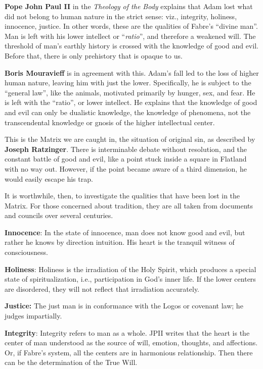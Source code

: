 \textbf{Pope John Paul II} in the \emph{Theology of the Body} explains that Adam lost what did not belong to human nature in the strict sense: viz., integrity, holiness, innocence, justice. In other words, these are the qualities of Fabre's ``divine man''. Man is left with his lower intellect or ``\emph{ratio}'', and therefore a weakened will. The threshold of man's earthly history is crossed with the knowledge of good and evil. Before that, there is only prehistory that is opaque to us.

\textbf{Boris Mouravieff} is in agreement with this. Adam's fall led to the loss of higher human nature, leaving him with just the lower. Specifically, he is subject to the ``general law'', like the animals, motivated primarily by hunger, sex, and fear. He is left with the ``ratio'', or lower intellect. He explains that the knowledge of good and evil can only be dualistic knowledge, the knowledge of phenomena, not the transcendental knowledge or gnosis of the higher intellectual center.

This is the Matrix we are caught in, the situation of original sin, as described by \textbf{Joseph Ratzinger}. There is interminable debate without resolution, and the constant battle of good and evil, like a point stuck inside a square in Flatland with no way out. However, if the point became aware of a third dimension, he would easily escape his trap.

It is worthwhile, then, to investigate the qualities that have been lost in the Matrix. For those concerned about tradition, they are all taken from documents and councils over several centuries.

\textbf{Innocence}: In the state of innocence, man does not know good and evil, but rather he knows by direction intuition. His heart is the tranquil witness of consciousness.

\textbf{Holiness}: Holiness is the irradiation of the Holy Spirit, which produces a special state of spiritualization, i.e., participation in God's inner life. If the lower centers are disordered, they will not reflect that irradiation accurately.

\textbf{Justice:} The just man is in conformance with the Logos or covenant law; he judges impartially.

\textbf{Integrity}: Integrity refers to man as a whole. JPII writes that the heart is the center of man understood as the source of will, emotion, thoughts, and affections. Or, if Fabre's system, all the centers are in harmonious relationship. Then there can be the determination of the True Will.


